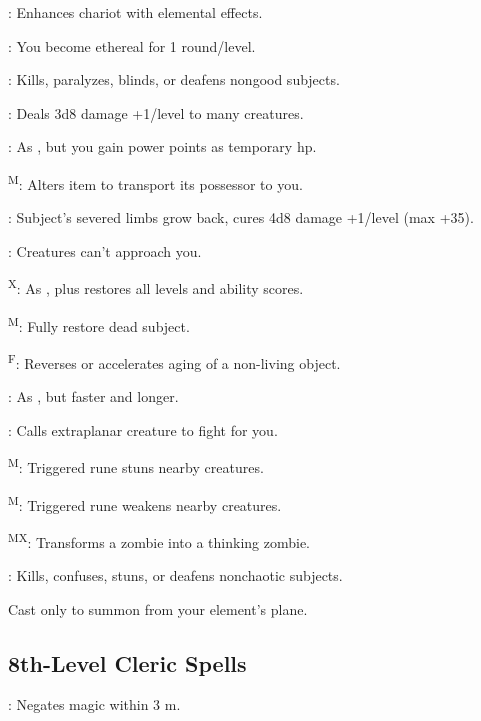 : Enhances chariot with elemental effects. %

: You become ethereal for 1 round/level.

: Kills, paralyzes, blinds, or deafens nongood subjects.

: Deals 3d8 damage +1/level to many creatures.

: As , but you gain power points as temporary hp.

\textsuperscript{M}: Alters item to transport its possessor to you.

: Subject's severed limbs grow back, cures 4d8 damage +1/level (max +35).

: Creatures can't approach you.

\textsuperscript{X}: As , plus restores all levels and ability scores.

\textsuperscript{M}: Fully restore dead subject.

\textsuperscript{F}: Reverses or accelerates aging of a non-living object. %

: As , but faster and longer.

\footnotemark[1]: Calls extraplanar creature to fight for you.

\textsuperscript{M}: Triggered rune stuns nearby creatures.

\textsuperscript{M}: Triggered rune weakens nearby creatures.

\textsuperscript{MX}: Transforms a zombie into a thinking zombie. %

: Kills, confuses, stuns, or deafens nonchaotic subjects.

 Cast only to summon from your element's plane.



\subsection{8th-Level Cleric Spells}

: Negates magic within 3 m.

